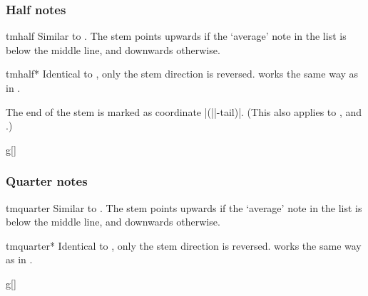 \documentclass[11pt,a4paper]{ltxdoc}
\begin{document}
\subsubsection{Half notes}\label{sec:music-notes:commands:half}
\begin{docCommand}{tmhalf}{}
  Similar to . The stem points upwards if the `average' note 
  in the list is below the middle line, and downwards otherwise.
\end{docCommand}
\begin{docCommand}{tmhalf*}{}
  Identical to , only the stem direction is reversed. 
   works the same way as in .
\end{docCommand}
The end of the stem is marked as coordinate |(||-tail)|. (This also 
applies to ,  and .)
\begin{dispExample}
\begin{tmsinglestaff}%
  \begin{tmstaff}{g}[]
       
  \end{tmstaff}%
\end{tmsinglestaff}
\end{dispExample}
\subsubsection{Quarter notes}\label{sec:music-notes:commands:quarter}
\begin{docCommand}{tmquarter}{}
  Similar to . The stem points upwards if the `average' note 
  in the list is below the middle line, and downwards otherwise.
\end{docCommand}
\begin{docCommand}{tmquarter*}{}
  Identical to , only the stem direction is reversed. 
   works the same way as in .
\end{docCommand}
\begin{dispExample}
\begin{tmsinglestaff}%
  \begin{tmstaff}{g}[]
       
  \end{tmstaff}%
\end{tmsinglestaff}
\end{dispExample}
\end{document}
